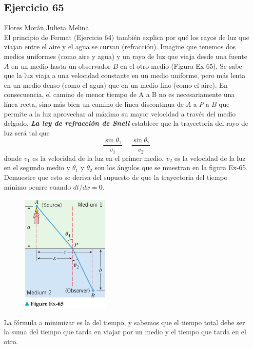 \documentclass[12pt]{article}
\begin{document}
\subsection{Ejercicio 65} Flores Morán Julieta Melina \\

El principio de Fermat (Ejercicio 64) también explica por qué los rayos de luz que viajan entre el aire y el agua se curvan (refracción). Imagine que tenemos dos medios uniformes (como aire y agua) y un rayo de luz que viaja desde una fuente $A$ en un medio hasta un observador $B$ en el otro medio (Figura Ex-65). Se sabe que la luz viaja a una velocidad constante en un medio uniforme, pero más lenta en un medio denso (como el agua) que en un medio fino (como el aire). En consecuencia, el camino de menor tiempo de A a B no es necesariamente una línea recta, sino más bien un camino de línea discontinua de $A$ a $P$ a $B$ que permite a la luz aprovechar al máximo su mayor velocidad a través del medio delgado. \textit{\textbf{La ley de refracción de Snell}} establece que la trayectoria del rayo de luz será tal que
\[
\frac{\sin{\theta_1}}{v_1}=\frac{\sin{\theta_2}}{v_2}
\]
donde $v_1$ es la velocidad de la luz en el primer medio, $v_2$ es la velocidad de la luz en el segundo medio y $\theta_1$ y $\theta_2$ son los ángulos que se muestran en la figura Ex-65. Demuestre que esto se deriva del supuesto de que la trayectoria del tiempo mínimo ocurre cuando $dt /dx = 0$.\\
\begin{figure}[H]
\centering
\includegraphics[width=0.4\textwidth]{../img/img_Lista3/3_65.png}
\end{figure}
La fórmula a minimizar es la del tiempo, y sabemos que el tiempo total debe ser la suma del tiempo que tarda en viajar por un medio y el tiempo que tarda en el otro. \\
\end{document}
